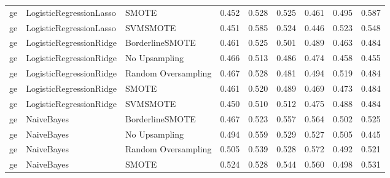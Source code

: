 \begin{tabular}{lllllllll}
      ge &      LogisticRegressionLasso &               SMOTE & 0.452 &                     0.528 &                 0.525 &                  0.461 &                                   0.495 &     0.587 \\
      ge &      LogisticRegressionLasso &            SVMSMOTE & 0.451 &                     0.585 &                 0.524 &                  0.446 &                                   0.523 &     0.548 \\
      ge &      LogisticRegressionRidge &     BorderlineSMOTE & 0.461 &                     0.525 &                 0.501 &                  0.489 &                                   0.463 &     0.484 \\
      ge &      LogisticRegressionRidge &       No Upsampling & 0.466 &                     0.513 &                 0.486 &                  0.474 &                                   0.458 &     0.455 \\
      ge &      LogisticRegressionRidge & Random Oversampling & 0.467 &                     0.528 &                 0.481 &                  0.494 &                                   0.519 &     0.484 \\
      ge &      LogisticRegressionRidge &               SMOTE & 0.461 &                     0.520 &                 0.489 &                  0.469 &                                   0.473 &     0.484 \\
      ge &      LogisticRegressionRidge &            SVMSMOTE & 0.450 &                     0.510 &                 0.512 &                  0.475 &                                   0.488 &     0.484 \\
      ge &                   NaiveBayes &     BorderlineSMOTE & 0.467 &                     0.523 &                 0.557 &                  0.564 &                                   0.502 &     0.525 \\
      ge &                   NaiveBayes &       No Upsampling & 0.494 &                     0.559 &                 0.529 &                  0.527 &                                   0.505 &     0.445 \\
      ge &                   NaiveBayes & Random Oversampling & 0.505 &                     0.539 &                 0.528 &                  0.572 &                                   0.492 &     0.521 \\
      ge &                   NaiveBayes &               SMOTE & 0.524 &                     0.528 &                 0.544 &                  0.560 &                                   0.498 &     0.531 \\

\end{tabular}
